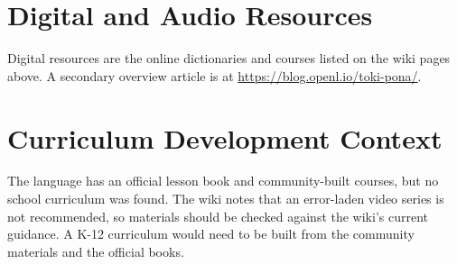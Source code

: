 \documentclass[12pt]{article}
\begin{document}
\section{Digital and Audio Resources}
Digital resources are the online dictionaries and courses listed on the wiki pages above. A secondary overview article is at \url{https://blog.openl.io/toki-pona/}.

\section{Curriculum Development Context}
The language has an official lesson book and community-built courses, but no school curriculum was found. The wiki notes that an error-laden video series is not recommended, so materials should be checked against the wiki's current guidance. A K-12 curriculum would need to be built from the community materials and the official books.
\end{document}
